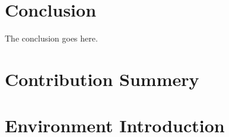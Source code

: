 \documentclass[journal]{IEEEtran}
\begin{document}



\section{Conclusion}
The conclusion goes here.




%
\section{Contribution Summery}

%
\appendices
\section{Environment Introduction}
\end{document}
